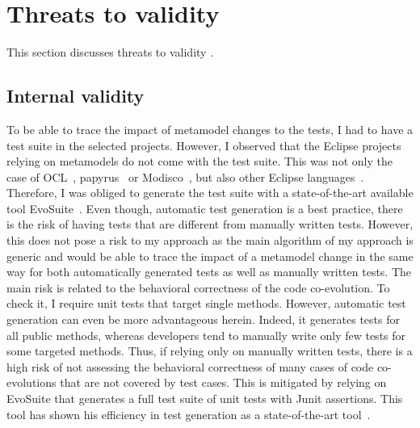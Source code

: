 \section{Threats to validity}\label{threat}
\noindent This section discusses threats to validity \cite{wohlin2012experimentation}.

\subsection{Internal validity}
To be able to trace the impact of metamodel changes to the tests, I had to have a test suite in the selected projects. However, I observed that the Eclipse projects relying on metamodels do not come with the test suite. This was not only the case of OCL~\cite{MDTOCL}, papyrus~\cite{MDTPapyrus} or Modisco~\cite{MDTModisco}, but also other Eclipse languages~\cite{UML241,BPMN2}. Therefore, I was obliged to generate the test suite with a state-of-the-art available tool EvoSuite~\cite{fraser2011evosuite}. 
Even though, automatic test generation is a best practice, there is the risk of having tests that are different from manually written tests. 
However, this does not pose a risk to my approach as the main algorithm of my approach is generic and would be able to trace the impact of a metamodel change in the same way for both automatically generated tests as well as manually written tests.  
The main risk is related to the behavioral correctness of the code co-evolution. To check it, I require unit tests that target single methods. 
However, automatic test generation can even be more advantageous herein. Indeed, it generates tests for all public methods, whereas developers tend to manually write only few tests for some targeted methods. Thus, if relying only on manually written tests, there is a high risk of not assessing the behavioral correctness of many cases of code co-evolutions that are not covered by test cases. 
This is mitigated by relying on EvoSuite that generates a full test suite of unit tests with Junit assertions. This tool has shown his efficiency in test generation as a state-of-the-art tool~\cite{DANGLOT2019110398,https://doi.org/10.1002/stvr.1601}. 

